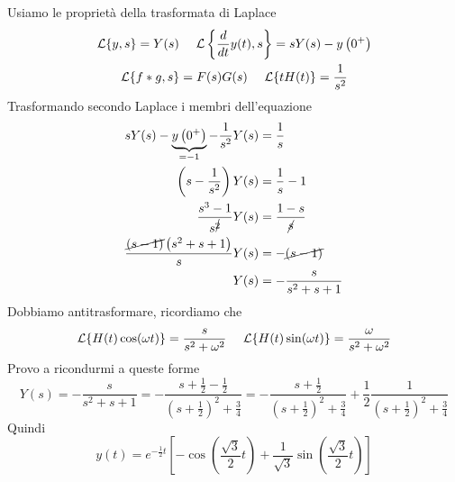 Usiamo le proprietà della trasformata di Laplace
\begin{gather*}
\mathcal{L}\{y,s\} =Y( s) \ \ \ \ \mathcal{L}\left\{\frac{d}{dt} y( t) ,s\right\} =sY( s) -y\left( 0^{+}\right)\\
\mathcal{L}\{f*g,s\} =F( s) G( s) \ \ \ \ \mathcal{L}\{tH( t)\} =\frac{1}{s^{2}}
\end{gather*}
Trasformando secondo Laplace i membri dell'equazione
\begin{align*}
sY( s) -\underbrace{y\left( 0^{+}\right)}_{=-1} -\frac{1}{s^{2}} Y( s) & =\frac{1}{s}\\
\left( s-\frac{1}{s^{2}}\right) Y( s) & =\frac{1}{s} -1\\
\frac{s^{3} -1}{s^{\cancel{2}}} Y( s) & =\frac{1-s}{\cancel{s}}\\
\frac{\cancel{( s-1)}\left( s^{2} +s+1\right)}{s} Y( s) & =-\cancel{( s-1)}\\
Y( s) & =-\frac{s}{s^{2} +s+1}
\end{align*}
Dobbiamo antitrasformare, ricordiamo che
\begin{equation*}
\mathcal{L}\{H( t)\cos( \omega t)\} =\frac{s}{s^{2} +\omega ^{2}} \ \ \ \ \mathcal{L}\{H( t)\sin( \omega t)\} =\frac{\omega }{s^{2} +\omega ^{2}}
\end{equation*}
Provo a ricondurmi a queste forme
\begin{equation*}
Y( s) =-\frac{s}{s^{2} +s+1} =-\frac{s+\frac{1}{2} -\frac{1}{2}}{\left( s+\frac{1}{2}\right)^{2} +\frac{3}{4}} =-\frac{s+\frac{1}{2}}{\left( s+\frac{1}{2}\right)^{2} +\frac{3}{4}} +\frac{1}{2}\frac{1}{\left( s+\frac{1}{2}\right)^{2} +\frac{3}{4}}
\end{equation*}
Quindi
\begin{equation*}
y( t) =e^{-\frac{1}{2} t}\left[ -\cos\left(\frac{\sqrt{3}}{2} t\right) +\frac{1}{\sqrt{3}}\sin\left(\frac{\sqrt{3}}{2} t\right)\right]
\end{equation*}
\Soluzione

